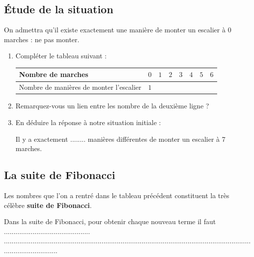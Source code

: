 \documentclass[oneside,12pt]{article}          %
\begin{document}
\subsection{Étude de la situation}
On admettra qu'il existe exactement une manière de monter un escalier à $0$ marches : ne pas monter.
\begin{enumerate}[itemsep = 2mm]
	\item Compléter le tableau suivant :
	
	\renewcommand{\arraystretch}{2} \hspace{-12.5mm}
	\begin{tabular}{| P{4cm} | P{1.75cm} | P{1.75cm} | P{1.75cm} | P{1.75cm} | P{1.75cm} | P{1.75cm} | P{1.75cm} |} \hline
		Nombre de marches & $0$ & $1$ & $2$ & $3$ & $4$ & $5$ & $6$ \\ \hline
		Nombre de manières de monter l'escalier & $1$ & & & & & & \\ \hline
	\end{tabular}

	\item Remarquez-vous un lien entre les nombre de la deuxième ligne ?
	
	\item En déduire la réponse à notre situation initiale :
	
	\begin{tcolorbox}[
	    enhanced , arc = 3pt , top = 4mm , hbox ,
	    fonttitle = \bfseries , title = Réponse , boxed title style = {arc = 3pt} ,
	    coltitle = black , colbacktitle = white ,
	    attach boxed title to top left = {xshift = 5mm , yshift = -4mm} ,
		]
		Il y a exactement ........ manières différentes de monter un escalier à 7 marches.
	\end{tcolorbox}

\end{enumerate}



\subsection{La suite de Fibonacci}
Les nombres que l'on a rentré dans le tableau précédent constituent la très célèbre \textbf{suite de Fibonacci}.

\begin{tcolorbox}[
    enhanced , arc = 3pt , top = 4mm ,
    fonttitle = \bfseries , title = Je retiens , boxed title style = {arc = 3pt} ,
    coltitle = black , colbacktitle = white ,
    attach boxed title to top left = {xshift = 5mm , yshift = -4mm} ,
	]
	\restoreskip
	Dans la suite de Fibonacci, pour obtenir chaque nouveau terme il faut ............................................. \\[10pt]
.............................................................................................................................................................
\end{tcolorbox}
\end{document}
